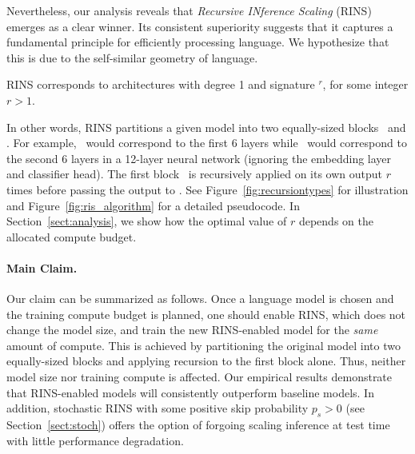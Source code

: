Nevertheless, our analysis reveals that \emph{Recursive INference Scaling} (RINS) emerges as a clear winner. Its consistent superiority  suggests that it captures a fundamental principle for efficiently processing language. We hypothesize that this is due to the self-similar geometry of language. 

\begin{definition}
RINS corresponds to architectures with degree 1 and signature \A$^r$\B, for some integer $r>1$.
\end{definition}

In other words, RINS partitions a given model into two equally-sized blocks \A\ and \B. For example, \A\ would correspond to the first 6 layers while \B\ would correspond to the second 6 layers in a 12-layer neural network (ignoring the embedding layer and classifier head). The first block \A\ is recursively applied on its own output $r$ times before passing the output to \B. See Figure~\ref{fig:recursiontypes} for  illustration and Figure~\ref{fig:ris_algorithm} for a detailed pseudocode. In Section~\ref{sect:analysis}, we show how the optimal value of $r$ depends on the allocated  compute budget.

\paragraph{Main Claim.}Our claim can be summarized as follows. Once a language model is chosen and the training compute budget is planned, one should enable RINS, which does not change the model size, and train the new RINS-enabled model for the \emph{same} amount of compute. This is achieved by partitioning the original model into two equally-sized blocks and applying recursion to the first block alone. Thus, neither model size nor training compute is affected. Our empirical results demonstrate that RINS-enabled models will consistently outperform baseline models. In addition,  stochastic RINS with some positive skip probability $p_s>0$ (see Section~\ref{sect:stoch}) offers the option of forgoing scaling inference at test time with little performance degradation.